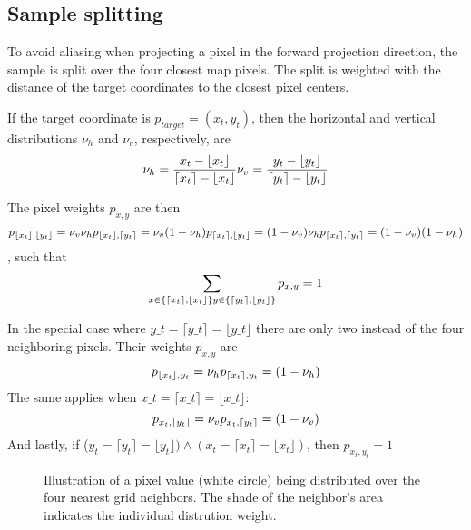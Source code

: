 \subsection{Sample splitting}\label{sample-splitting}

To avoid aliasing when projecting a pixel in the forward projection
direction, the sample is split over the four closest map pixels. The
split is weighted with the distance of the target coordinates to the
closest pixel centers.

If the target coordinate is \(p_{target}=(x_t, y_t)\), then the
horizontal and vertical distributions \(\nu_h\) and \(\nu_v\),
respectively, are \[
\nu_h = \frac{x_t - \lfloor x_t \rfloor}{\lceil x_t \rceil - \lfloor x_t \rfloor} \\
\nu_v = \frac{y_t - \lfloor y_t \rfloor}{\lceil y_t \rceil - \lfloor y_t \rfloor}
\]

The pixel weights \(p_{x,y}\) are then \[
p_{\lfloor x_t \rfloor, \lfloor y_t \rfloor} = \nu_v \nu_h\\
p_{\lfloor x_t \rfloor, \lceil y_t \rceil} = \nu_v (1 - \nu_h)\\
p_{\lceil x_t \rceil, \lfloor y_t \rfloor} =  (1 - \nu_v) \nu_h\\
p_{\lceil x_t \rceil, \lceil y_t \rceil} = (1 - \nu_v) (1 - \nu_h)
\] , such that \[
\sum\limits_{
x \in \{\lceil x_t \rceil, \lfloor x_t \rfloor\}\\
y \in \{\lceil y_t \rceil, \lfloor y_t \rfloor\}
} p_{x,y} = 1
\]

In the special case where $y\_t = \lceil y\_t \rceil = \lfloor y\_t\rfloor$ there are only two instead of the four neighboring pixels. Their weights \(p_{x,y}\) are \[
p_{\lfloor x_t \rfloor, y_t} = \nu_h\\
p_{\lceil x_t \rceil, y_t} = (1 - \nu_h)
\] The same applies when $x\_t = \lceil x\_t \rceil = \lfloor x\_t\rfloor$: \[
p_{x_t, \lfloor y_t \rfloor} = \nu_v\\
p_{x_t, \lceil y_t \rceil} = (1 - \nu_v)
\] And lastly, if
(\(y_t = \lceil y_t \rceil = \lfloor y_t \rfloor ) \land (x_t = \lceil x_t \rceil = \lfloor x_t \rfloor )\),
then \(p_{x_t, y_t} = 1\)

\begin{figure}[htbp]
    \centering
    \def\svgwidth{10cm}
    
    \caption{Illustration of a pixel value (white circle) being distributed over the four nearest grid neighbors. The shade of the neighbor's area indicates the individual distrution weight.}
    \label{fig:Sample_splitting}
\end{figure}

